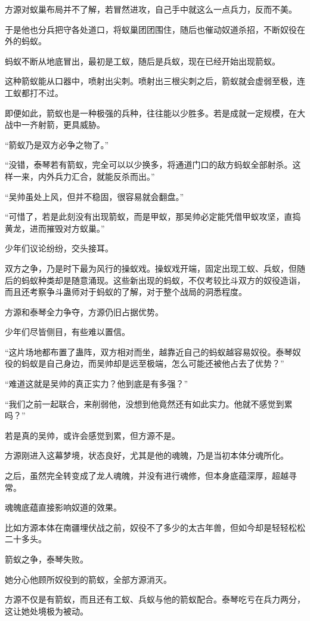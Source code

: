 \begin{this_body}
方源对蚁巢布局并不了解，若冒然进攻，自己手中就这么一点兵力，反而不美。

于是他也分兵把守各处道口，将蚁巢团团围住，随后也催动奴道杀招，不断奴役在外的蚂蚁。

蚂蚁不断从地底冒出，最初是工蚁，随后是兵蚁，现在已经开始出现箭蚁。

这种箭蚁能从口器中，喷射出尖刺。喷射出三根尖刺之后，箭蚁就会虚弱至极，连工蚁都打不过。

即便如此，箭蚁也是一种极强的兵种，往往能以少胜多。若是成就一定规模，在大战中一齐射箭，更具威胁。

“箭蚁乃是双方必争之物了。”

“没错，泰琴若有箭蚁，完全可以以少换多，将通道门口的敌方蚂蚁全部射杀。这样一来，内外兵力汇合，就能反杀而出。”

“吴帅虽处上风，但并不稳固，很容易就会翻盘。”

“可惜了，若是此刻没有出现箭蚁，而是甲蚁，那吴帅必定能凭借甲蚁攻坚，直捣黄龙，进而摧毁对方蚁巢。”

少年们议论纷纷，交头接耳。

双方之争，乃是时下最为风行的操蚁戏。操蚁戏开端，固定出现工蚁、兵蚁，但随后的蚂蚁种类却是随意涌现。这些新出现的蚂蚁，不仅考较比斗双方的奴役造诣，而且还考察争斗蛊师对于蚂蚁的了解，对于整个战局的洞悉程度。

方源和泰琴全力争夺，方源仍旧占据优势。

少年们尽皆侧目，有些难以置信。

“这片场地都布置了蛊阵，双方相对而坐，越靠近自己的蚂蚁越容易奴役。泰琴奴役的蚂蚁是自己身边，而吴帅却是远至极端，怎么可能还被他占去了优势？”

“难道这就是吴帅的真正实力？他到底是有多强？”

“我们之前一起联合，来削弱他，没想到他竟然还有如此实力。他就不感觉到累吗？”

若是真的吴帅，或许会感觉到累，但方源不是。

方源刚进入这幕梦境，状态良好，尤其是他的魂魄，乃是当初本体分魂所化。

之后，虽然完全转变成了龙人魂魄，并没有进行魂修，但本身底蕴深厚，超越寻常。

魂魄底蕴直接影响奴道的效果。

比如方源本体在南疆埋伏战之前，奴役不了多少的太古年兽，但如今却是轻轻松松二十多头。

箭蚁之争，泰琴失败。

她分心他顾所奴役到的箭蚁，全部方源消灭。

方源不仅是有箭蚁，而且还有工蚁、兵蚁与他的箭蚁配合。泰琴吃亏在兵力两分，这让她处境极为被动。


\end{this_body}

